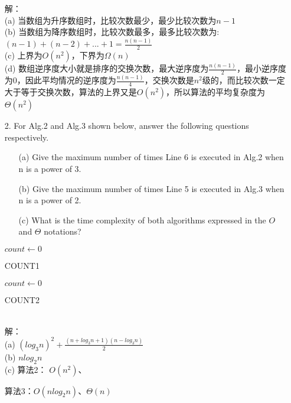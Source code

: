 \documentclass{article}
\begin{document}
\begin{itemize}
解：\\
(a) 当数组为升序数组时，比较次数最少，最少比较次数为$n-1$\\
(b) 当数组为降序数组时，比较次数最多，最多比较次数为:$(n-1)+(n-2)+...+1=\frac{n(n-1)}{2}$\\
(c) 上界为$O(n^2)$，下界为$\Omega (n)$\\
(d) 数组逆序度大小就是排序的交换次数，最大逆序度为$\frac{n(n-1)}{2}$，最小逆序度为$0$，因此平均情况的逆序度为$\frac{n(n-1)}{4}$，交换次数是$n^2$级的，而比较次数一定大于等于交换次数，算法的上界又是$O(n^2)$，所以算法的平均复杂度为$\Theta(n^2) $

\item[2.] For Alg.2 and Alg.3 shown below, answer the following questions respectively.
\begin{itemize}
\item[(a)] Give the maximum number of times Line 6 is executed in Alg.2 when n is a power of 3.
\item[(b)] Give the maximum number of times Line 5 is executed in Alg.3 when n is a power of 2.
\item[(c)] What is the time complexity of both algorithms expressed in the $O$ and $\Theta$ notations?
\end{itemize}

\begin{minipage}[t]{.45\textwidth}
\vspace{0pt}
\IncMargin{1em} %
\begin{algorithm}[H] 
    $count \leftarrow 0$\;
    \caption{COUNT1}
\end{algorithm}
\DecMargin{1em}
\end{minipage}
\hfill
\begin{minipage}[t]{.45\textwidth}
\vspace{0pt}
\IncMargin{1em} %
\begin{algorithm}[H] 
    $count \leftarrow 0$\;
    \caption{COUNT2}
\end{algorithm}
\DecMargin{1em}
\end{minipage}\\
解：\\
(a) $(log_{3}{n})^2+\frac{(n+log_{3}{n}+1)(n-log_{3}{n})}{2}$\\
(b) $n log_{2}{n}$\\
(c) 算法2： $O(n^2)$、 \par \hspace{1.1em}  算法3：$O(n log_{2}{n})$、$\Theta (n)$


\end{itemize}
\end{document}
